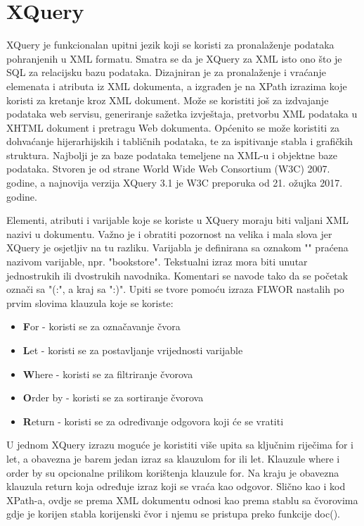 \documentclass{foi}
\begin{document}
\section{XQuery}

XQuery je funkcionalan upitni jezik koji se koristi za pronalaženje podataka pohranjenih u XML formatu. Smatra se da je XQuery za XML isto ono što je SQL za relacijsku bazu podataka. Dizajniran je za pronalaženje i vraćanje elemenata i atributa iz XML dokumenta, a izgrađen je na XPath izrazima koje koristi za kretanje kroz XML dokument. Može se koristiti još za izdvajanje podataka web servisu, generiranje sažetka izvještaja, pretvorbu XML podataka u XHTML dokument i pretragu Web dokumenta. Općenito se može koristiti za dohvaćanje hijerarhijskih i tabličnih podataka, te za ispitivanje stabla i grafičkih struktura. Najbolji je za baze podataka temeljene na XML-u i objektne baze podataka. Stvoren je od strane World Wide Web Consortium (W3C) 2007. godine, a najnovija verzija XQuery 3.1 je W3C preporuka od 21. ožujka 2017. godine.

Elementi, atributi i varijable koje se koriste u XQuery moraju biti valjani XML nazivi u dokumentu. Važno je i obratiti pozornost na velika i mala slova jer XQuery je osjetljiv na tu razliku. Varijabla je definirana sa oznakom "\textdollar " praćena nazivom varijable, npr. "\textdollar bookstore". Tekstualni izraz mora biti unutar jednostrukih ili dvostrukih navodnika. Komentari se navode tako da se početak označi sa "(:", a kraj sa ":)". Upiti se tvore pomoću izraza FLWOR nastalih po prvim slovima klauzula koje se koriste:

\begin{itemize}
\item \textbf{F}or - koristi se za označavanje čvora
\item \textbf{L}et - koristi se za postavljanje vrijednosti varijable
\item \textbf{W}here - koristi se za filtriranje čvorova
\item \textbf{O}rder by - koristi se za sortiranje čvorova
\item \textbf{R}eturn - koristi se za određivanje odgovora koji će se vratiti
\end{itemize}

U jednom XQuery izrazu moguće je koristiti više upita sa ključnim riječima for i let, a obavezna je barem jedan izraz sa klauzulom for ili let. Klauzule where i order by su opcionalne prilikom korištenja klauzule for. Na kraju je obavezna klauzula return koja određuje izraz koji se vraća kao odgovor. Slično kao i kod XPath-a, ovdje se prema XML dokumentu odnosi kao prema stablu sa čvorovima gdje je korijen stabla korijenski čvor i njemu se pristupa preko funkcije doc().
\end{document}
